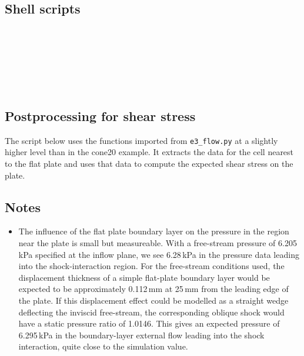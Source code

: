 \subsection{Shell scripts}
\label{hakkinen-sh-files}
\topbar

\bottombar\\
\topbar
{}
\bottombar\\
\topbar

\bottombar\\
\topbar

\bottombar\\
\topbar

\bottombar

\subsection{Postprocessing for shear stress}
\label{hakkinen-post-processing}
%
The script below uses the functions imported from \texttt{e3\_flow.py}
at a slightly higher level than in the cone20 example.
It extracts the data for the cell nearest to the flat plate and uses that data
to compute the expected shear stress on the plate.

\noindent
\topbar

\bottombar

\subsection{Notes}
\begin{itemize}
 \item The influence of the flat plate boundary layer on the pressure 
   in the region near the plate is small but measureable.
   With a free-stream pressure of 6.205\,kPa specified at the inflow plane,
   we see 6.28\,kPa in the pressure data leading into the shock-interaction region.
   For the free-stream conditions used, the displacement thickness of a simple
   flat-plate boundary layer would be expected to be approximately 0.112\,mm
   at 25\,mm from the leading edge of the plate.
   If this displacement effect could be modelled as a straight wedge deflecting the
   inviscid free-stream, the corresponding oblique shock would have 
   a static pressure ratio of 1.0146.
   This gives an expected pressure of 6.295\,kPa in the boundary-layer external flow
   leading into the shock interaction, quite close to the simulation value. 
\end{itemize}
